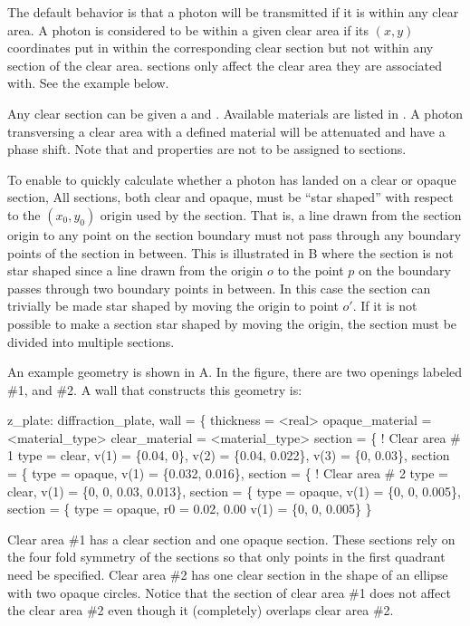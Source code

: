 The default behavior is that a photon will be transmitted if it is
within any clear area. A photon is considered to be within a given
clear area if its $(x,y)$ coordinates put in within the corresponding
clear section but not within any  section of the clear area.
 sections only affect the clear area they are associated
with. See the example below.

Any clear section can be given a  and
. Available materials are listed in
. A photon transversing a clear area with a defined
material will be attenuated and have a phase shift. Note that
 and  properties are not to be assigned to
 sections.

To enable \bmad to quickly calculate whether a photon has landed on a
clear or opaque section, All sections, both clear and opaque, must be
``star shaped'' with respect to the $(x_0, y_0)$ origin used by the
section. That is, a line drawn from the section origin to any point on
the section boundary must not pass through any boundary points of the
section in between. This is illustrated in B where
the section is not star shaped since a line drawn from the origin $o$
to the point $p$ on the boundary passes through two boundary points in
between. In this case the section can trivially be made star shaped by
moving the origin to point $o'$. If it is not possible to make a
section star shaped by moving the origin, the section must be divided
into multiple sections.

An example geometry is shown in A.
In the figure, there are two openings labeled \#1, and \#2. A
wall that constructs this geometry is:
\begin{example}
  z_plate: diffraction_plate, wall = \{
    thickness = <real>
    opaque_material = <material_type>
    clear_material = <material_type>
    section = \{           ! Clear area \# 1
      type = clear, 
      v(1) = \{0.04, 0\}, v(2) = \{0.04, 0.022\},
      v(3) = \{0, 0.03\},
    section = \{
      type = opaque,
      v(1) = \{0.032, 0.016\},
    section = \{          ! Clear area \# 2
      type = clear,
      v(1) = \{0, 0, 0.03, 0.013\},
    section = \{
      type = opaque,
      v(1) = \{0, 0, 0.005\},
    section = \{
      type = opaque,
      r0 = 0.02, 0.00
      v(1) = \{0, 0, 0.005\} \}
\end{example}
Clear area \#1 has a clear section and one opaque section. These
sections rely on the four fold symmetry of the sections so that only
points in the first quadrant need be specified. Clear area \#2 has one
clear section in the shape of an ellipse with two opaque circles. Notice
that the  section of clear area \#1 does not affect the clear
area \#2 even though it (completely) overlaps clear area \#2.


